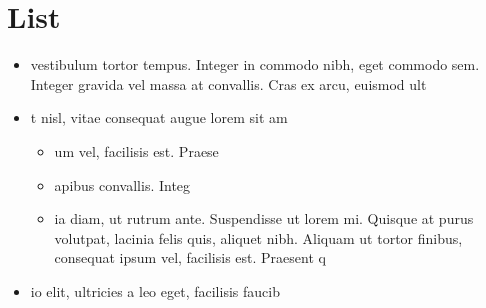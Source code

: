\documentclass[]{article}
\begin{document}
\section{List}
\begin{itemize}
\item  vestibulum tortor tempus. Integer in commodo nibh, eget commodo sem. Integer gravida vel massa at convallis. Cras ex arcu, euismod ult
\item t nisl, vitae consequat augue lorem sit am
\begin{itemize}
\item um vel, facilisis est. Praese
\item apibus convallis. Integ
\item ia diam, ut rutrum ante. Suspendisse ut lorem mi. Quisque at purus volutpat, lacinia felis quis, aliquet nibh. Aliquam ut tortor finibus, consequat ipsum vel, facilisis est. Praesent q
\end{itemize}
\item io elit, ultricies a leo eget, facilisis faucib
\end{itemize}

\clearpage
\end{document}
